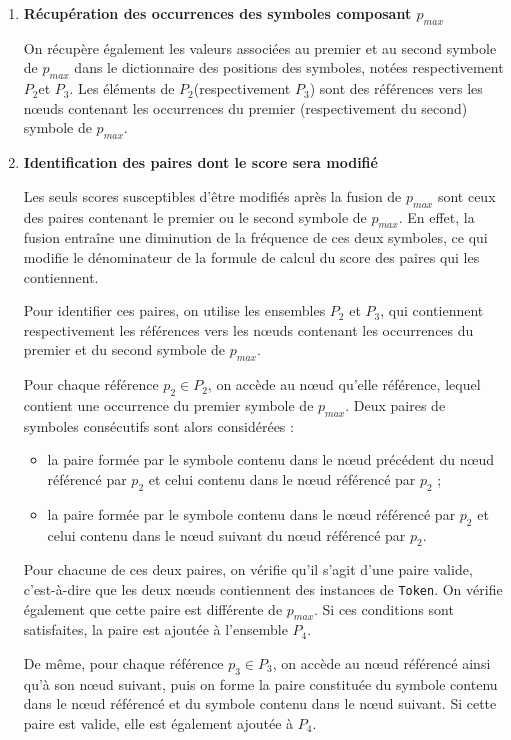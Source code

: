 \documentclass[12pt,a4paper]{report}
\begin{document}
\begin{enumerate}
\begin{enumerate}[label=\alph*)]
			\item \textbf{Récupération des occurrences des symboles composant $p_{max}$}
			
			On récupère également les valeurs associées au premier et au second symbole de $p_{max}$ dans le dictionnaire des positions des symboles, notées respectivement $P_{2}$et $P_{3}$. Les éléments de $P_{2}$(respectivement $P_{3}$) sont des références vers les nœuds contenant les occurrences du premier (respectivement du second) symbole de $p_{max}$.
			
			\item  \textbf{Identification des paires dont le score sera modifié}
			
			Les seuls scores susceptibles d'être modifiés après la fusion de $p_{max}$ sont ceux des paires contenant le premier ou le second symbole de $p_{max}$. En effet, la fusion entraîne une diminution de la fréquence de ces deux symboles, ce qui modifie le dénominateur de la formule de calcul du score des paires qui les contiennent.
			
			Pour identifier ces paires, on utilise les ensembles $P_2$ et $P_3$, qui contiennent respectivement les références vers les nœuds contenant les occurrences du premier et du second symbole de $p_{max}$.
			
			Pour chaque référence $p_2 \in 	P_2$, on accède au nœud qu'elle référence, lequel contient une occurrence du premier symbole de $p_{max}$. Deux paires de symboles consécutifs sont alors considérées :
			
			\begin{itemize}
				\item la paire formée par le symbole contenu dans le nœud précédent du nœud référencé par $p_2$ et celui contenu dans le nœud référencé par $p_2$ ;
				
				\item la paire formée par le symbole contenu dans le nœud référencé par $p_2$ et celui contenu dans le nœud suivant du nœud référencé par $p_2$.
			\end{itemize}
			
			Pour chacune de ces deux paires, on vérifie qu'il s'agit d'une paire valide, c'est-à-dire que les deux nœuds contiennent des instances de \texttt{Token}. On vérifie également que cette paire est différente de $p_{max}$. Si ces conditions sont satisfaites, la paire est ajoutée à l'ensemble $P_4$.
			
			De même, pour chaque référence $p_3 \in P_3$, on accède au nœud référencé ainsi qu'à son nœud suivant, puis on forme la paire constituée du symbole contenu dans le nœud référencé et du symbole contenu dans le nœud suivant. Si cette paire est valide, elle est également ajoutée à $P_4$.
			

\end{enumerate}
\end{enumerate}
\end{document}
